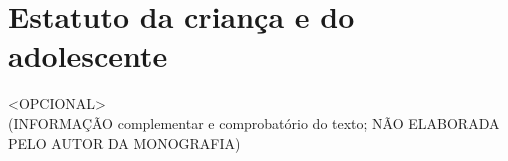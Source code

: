 \anexos

\chapter{Estatuto da criança e do adolescente}
<OPCIONAL>\\
(INFORMAÇÃO complementar e comprobatório do texto; NÃO ELABORADA PELO AUTOR DA MONOGRAFIA)


